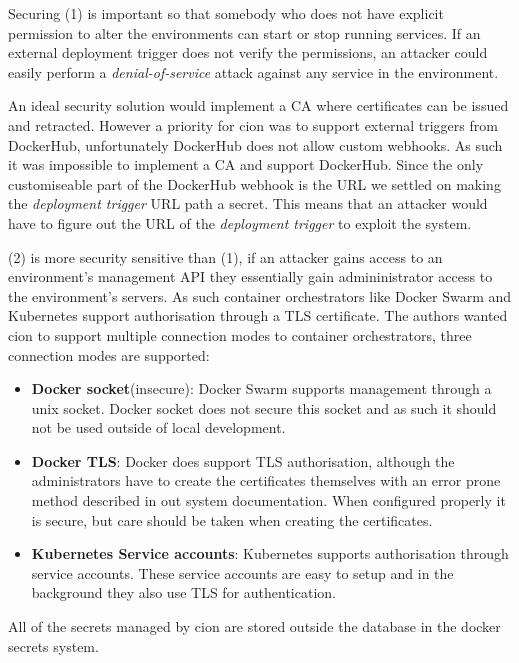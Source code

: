 Securing (1) is important so that somebody who does not have explicit permission to alter the environments can start or stop running services. If an external deployment trigger does not verify the permissions, an attacker could easily perform a \textit{denial-of-service} attack against any service in the environment.

An ideal security solution would implement a \acrfull{CA} where certificates can be issued and retracted. However a priority for cion was to support external triggers from DockerHub, unfortunately DockerHub does not allow custom webhooks. As such it was impossible to implement a \acrshort{CA} and support DockerHub. Since the only customiseable part of the DockerHub webhook is the \acrshort{URL} we settled on making the \textit{deployment trigger} \acrshort{URL} path a secret. This means that an attacker would have to figure out the \acrshort{URL} of the \textit{deployment trigger} to exploit the system. 

(2) is more security sensitive than (1), if an attacker gains access to an environment's management \acrshort{API} they essentially gain admininistrator access to the environment's servers. As such container orchestrators like Docker Swarm and Kubernetes support authorisation through a \acrfull{TLS} certificate. The authors wanted cion to support multiple connection modes to container orchestrators, three connection modes are supported:

\begin{itemize}
    \item \textbf{Docker socket}(insecure): Docker Swarm supports management through a unix socket. Docker socket does not secure this socket and as such it should not be used outside of local development. 
    \item \textbf{Docker TLS}: Docker does support TLS authorisation, although the administrators have to create the certificates themselves with an error prone method described in out system documentation. When configured properly it is secure, but care should be taken when creating the certificates. 
    \item \textbf{Kubernetes Service accounts}: Kubernetes supports authorisation through service accounts. These service accounts are easy to setup and in the background they also use \acrshort{TLS} for authentication.
\end{itemize}

All of the secrets managed by cion are stored outside the database in the docker secrets system.

